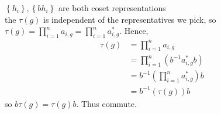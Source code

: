\documentclass{article}
\begin{document}
\begin{homeworkProblem}
$\left\{ h_i \right\}, \left\{ b h_i \right\}$ are both coset representations\\
the $\tau (g)$ is independent of the representatives we pick,
so $\tau (g) = \prod_{i=1}^{n} a_{i,g} = \prod_{i=1}^{n} a^{*}_{i,g}$. Hence,\\
\begin{align}
    \tau (g) &= \prod_{i=1}^n a_{i,g} \\
    &= \prod_{i=1}^{n} \left( b^{-1} a^*_{i,g} b \right)\\
    &= b^{-1} \left( \prod_{i=1}^n a^*_{i,g} \right) b\\
    &= b^{-1} \left( \tau (g) \right) b
\end{align}
so $b \tau (g) = \tau (g) b$. Thus commute.





    
\end{homeworkProblem}

\pagebreak
\end{document}
